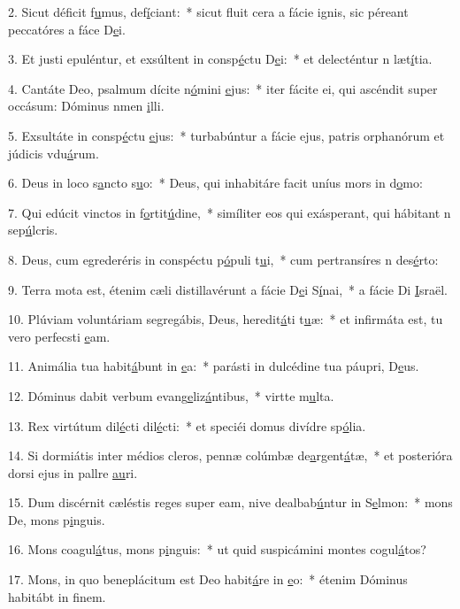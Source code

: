 2. Sicut déficit f\uline{u}mus, def\uline{í}ciant:~* sicut fluit cera a fácie ignis, sic péreant peccatóres a fáce D\uline{e}i.\par 
3. Et justi epuléntur, et exsúltent in consp\uline{é}ctu D\uline{e}i:~* et delecténtur n læt\uline{í}tia.\par 
4. Cantáte Deo, psalmum dícite n\uline{ó}mini \uline{e}jus:~* iter fácite ei, qui ascéndit super occásum: Dóminus nmen \uline{i}lli.\par 
5. Exsultáte in consp\uline{é}ctu \uline{e}jus:~* turbabúntur a fácie ejus, patris orphanórum et júdicis vdu\uline{á}rum.\par 
6. Deus in loco s\uline{a}ncto s\uline{u}o:~* Deus, qui inhabitáre facit uníus mors in d\uline{o}mo:\par 
7. Qui edúcit vinctos in f\uline{o}rtit\uline{ú}dine,~* simíliter eos qui exásperant, qui hábitant n sep\uline{ú}lcris.\par 
8. Deus, cum egrederéris in conspéctu p\uline{ó}puli t\uline{u}i,~* cum pertransíres n des\uline{é}rto:\par 
9. Terra mota est, étenim cæli distillavérunt a fácie D\uline{e}i S\uline{í}nai,~* a fácie Di \uline{I}sraël.\par 
10. Plúviam voluntáriam segregábis, Deus, heredit\uline{á}ti t\uline{u}æ:~* et infirmáta est, tu vero perfecsti \uline{e}am.\par 
11. Animália tua habit\uline{á}bunt in \uline{e}a:~* parásti in dulcédine tua páupri, D\uline{e}us.\par 
12. Dóminus dabit verbum evang\uline{e}liz\uline{á}ntibus,~* virtte m\uline{u}lta.\par 
13. Rex virtútum dil\uline{é}cti dil\uline{é}cti:~* et speciéi domus divídre sp\uline{ó}lia.\par 
14. Si dormiátis inter médios cleros, pennæ colúmbæ de\uline{a}rgent\uline{á}tæ,~* et posterióra dorsi ejus in pallre \uline{au}ri.\par 
15. Dum discérnit cæléstis reges super eam, nive dealbab\uline{ú}ntur in S\uline{e}lmon:~* mons De, mons p\uline{i}nguis.\par 
16. Mons coagul\uline{á}tus, mons p\uline{i}nguis:~* ut quid suspicámini montes cogul\uline{á}tos?\par 
17. Mons, in quo beneplácitum est Deo habit\uline{á}re in \uline{e}o:~* étenim Dóminus habitábt in f\uline{i}nem.\par 
